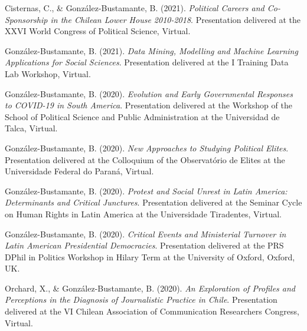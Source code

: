 \begin{publications}
\begin{benumerate}{71}
\item{\small Cisternas, C., \& González-Bustamante, B. (2021). {\itshape Political Careers and Co-Sponsorship in the Chilean Lower House 2010-2018}. Presentation delivered at the XXVI World Congress of Political Science, Virtual.}\vspace{1mm}

\item{\small González-Bustamante, B. (2021). {\itshape Data Mining, Modelling and Machine Learning Applications for Social Sciences}. Presentation delivered at the I Training Data Lab Workshop, Virtual.}\vspace{1mm}

\item{\small González-Bustamante, B. (2020). {\itshape Evolution and Early Governmental Responses to COVID-19 in South America}. Presentation delivered at the Workshop of the School of Political Science and Public Administration at the Universidad de Talca, Virtual.}\vspace{1mm}

\item{\small González-Bustamante, B. (2020). {\itshape New Approaches to Studying Political Elites}. Presentation delivered at the Colloquium of the Observatório de Elites at the Universidade Federal do Paraná, Virtual.}\vspace{1mm}

\item{\small González-Bustamante, B. (2020). {\itshape Protest and Social Unrest in Latin America: Determinants and Critical Junctures}. Presentation delivered at the Seminar Cycle on Human Rights in Latin America at the Universidade Tiradentes, Virtual.}\vspace{1mm} %

\item{\small González-Bustamante, B. (2020). {\itshape Critical Events and Ministerial Turnover in Latin American Presidential Democracies}. Presentation delivered at the PRS DPhil in Politics Workshop in Hilary Term at the University of Oxford, Oxford, UK.}\vspace{1mm}

\item{\small Orchard, X., \& González-Bustamante, B. (2020). {\itshape An Exploration of Profiles and Perceptions in the Diagnosis of Journalistic Practice in Chile}. Presentation delivered at the VI Chilean Association of Communication Researchers Congress, Virtual.}\vspace{1mm}


\end{benumerate}
\end{publications}

